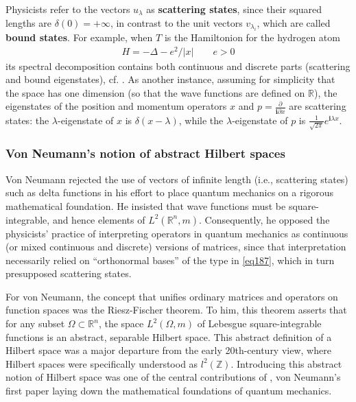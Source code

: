 \documentclass[12pt,b5paper,notitlepage]{article}
\theoremstyle{definition}
\theoremstyle{plain}
\newcommand{\im}{\mathbf{i}}
\newcommand{\Zbb}{\mathbb Z}
\newcommand{\Rbb}{\mathbb R}
\numberwithin{equation}{section}
\begin{document}
Physicists refer to the vectors $u_\lambda$ as \textbf{scattering states}, since their squared lengths are $\delta(0)=+\infty$, in contrast to the unit vectors $v_{\lambda_i}$, which are called \textbf{bound states}. For example, when $T$ is the Hamiltonion for the hydrogen atom
\begin{align*}
H=-\Delta-e^2/|x|\qquad e>0
\end{align*}
its spectral decomposition contains both continuous and discrete parts (scattering and bound eigenstates), cf. \cite[Sec. 39]{Dir30}. As another instance, assuming for simplicity that the space has one dimension (so that the wave functions are defined on $\Rbb$), the eigenstates of the position and momentum operators $x$ and $p=\frac{\partial}{\im\partial x}$ are scattering states: the $\lambda$-eigenstate of $x$ is $\delta(x-\lambda)$, while the $\lambda$-eigenstate of $p$ is $\frac 1{\sqrt{2\pi}}e^{\im\lambda x}$.



\subsubsection{Von Neumann's notion of abstract Hilbert spaces}


Von Neumann rejected the use of vectors of infinite length (i.e., scattering states) such as delta functions in his effort to place quantum mechanics on a rigorous mathematical foundation. He insisted that wave functions must be square-integrable, and hence elements of $L^2(\Rbb^n,m)$. Consequently, he opposed the physicists' practice of interpreting operators in quantum mechanics as continuous (or mixed continuous and discrete) versions of matrices, since that interpretation necessarily relied on ``orthonormal bases'' of the type in \eqref{eq187}, which in turn presupposed scattering states.

For von Neumann, the concept that unifies ordinary matrices and operators on function spaces was the Riesz-Fischer theorem. To him, this theorem asserts that for any subset $\Omega\subset\Rbb^n$, the space $L^2(\Omega,m)$ of Lebesgue square-integrable functions is an abstract, separable Hilbert space. This abstract definition of a Hilbert space was a major departure from the early 20th-century view, where Hilbert spaces were specifically understood as $l^2(\Zbb)$. Introducing this abstract notion of Hilbert space was one of the central contributions of \cite{vN27}, von Neumann's first paper laying down the mathematical foundations of quantum mechanics.
\end{document}

